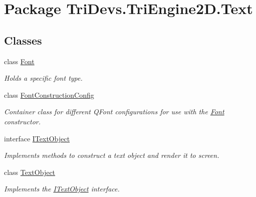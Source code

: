 \hypertarget{namespace_tri_devs_1_1_tri_engine2_d_1_1_text}{\section{Package Tri\-Devs.\-Tri\-Engine2\-D.\-Text}
\label{namespace_tri_devs_1_1_tri_engine2_d_1_1_text}
}
\subsection*{Classes}
\begin{DoxyCompactItemize}
\item 
class \hyperlink{class_tri_devs_1_1_tri_engine2_d_1_1_text_1_1_font}{Font}
\begin{DoxyCompactList}\small\item\em Holds a specific font type. \end{DoxyCompactList}\item 
class \hyperlink{class_tri_devs_1_1_tri_engine2_d_1_1_text_1_1_font_construction_config}{Font\-Construction\-Config}
\begin{DoxyCompactList}\small\item\em Container class for different Q\-Font configurations for use with the \hyperlink{class_tri_devs_1_1_tri_engine2_d_1_1_text_1_1_font}{Font} constructor. \end{DoxyCompactList}\item 
interface \hyperlink{interface_tri_devs_1_1_tri_engine2_d_1_1_text_1_1_i_text_object}{I\-Text\-Object}
\begin{DoxyCompactList}\small\item\em Implements methods to construct a text object and render it to screen. \end{DoxyCompactList}\item 
class \hyperlink{class_tri_devs_1_1_tri_engine2_d_1_1_text_1_1_text_object}{Text\-Object}
\begin{DoxyCompactList}\small\item\em Implements the \hyperlink{interface_tri_devs_1_1_tri_engine2_d_1_1_text_1_1_i_text_object}{I\-Text\-Object} interface. \end{DoxyCompactList}\end{DoxyCompactItemize}
